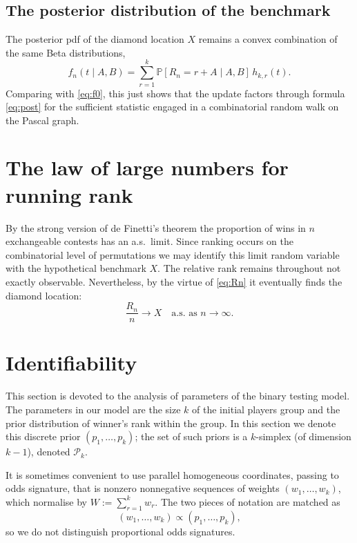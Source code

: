 \documentclass[11pt,reqno]{amsart}
\theoremstyle{definition}
\theoremstyle{remark}
\numberwithin{equation}{section}
\begin{document}
\subsection{The posterior distribution of the benchmark}

The posterior pdf of the diamond location \(X\) remains a convex combination of the same Beta distributions,
\begin{equation}\label{eq:fn}
f_n(t\mid A,B)=\sum_{r=1}^k\mathbb{P}[R_n=r+A\mid A,B]\,h_{k,r}(t).
\end{equation}
Comparing with \eqref{eq:f0}, this just shows that the update factors through formula \eqref{eq:post} for the sufficient statistic engaged in a combinatorial random walk on the Pascal graph.

\section{The law of large numbers for running rank}

By the strong version of de Finetti's theorem the proportion of wins in \(n\) exchangeable contests has an a.s.\ limit. Since ranking occurs on the combinatorial level of permutations we may identify this limit random variable with the hypothetical benchmark \(X\). The relative rank remains throughout not exactly observable. Nevertheless, by the virtue of \eqref{eq:Rn} it eventually finds the diamond location:
\begin{equation}\label{eq:LLN}
\frac{R_n}{n}\to X\quad\text{a.s.\ as }n\to\infty.
\end{equation}

\section{Identifiability}

This section is devoted to the analysis of parameters of the binary testing model. The parameters in our model are the size \(k\) of the initial players group and the prior distribution of winner's rank within the group. In this section we denote this discrete prior \((p_1,\dots,p_k)\); the set of such priors is a \(k\)-simplex (of dimension \(k-1\)), denoted \(\mathcal{P}_k\).

It is sometimes convenient to use parallel homogeneous coordinates, passing to odds signature, that is nonzero nonnegative sequences of weights \((w_1,\dots,w_k)\), which normalise by \(W:=\sum_{r=1}^k w_r\). The two pieces of notation are matched as
\[
(w_1,\dots,w_k)\propto(p_1,\dots,p_k),
\]
so we do not distinguish proportional odds signatures.
\end{document}
